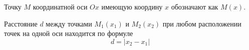 \secdown

Точку $M$ координатной оси $Ox$ имеющую координу $x$ обозначают как $M(x)$.


Расстояние $d$ между точками $M_1(x_1)$ и $M_2(x_2)$ при любом расположении
точек на одной оси находится по формуле
\begin{equation}\tag{1}
d=|x_2-x_1|
\end{equation}



\secup
